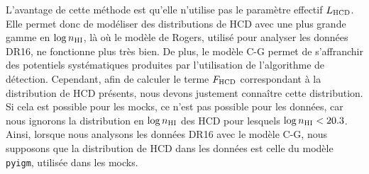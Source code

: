\documentclass[11pt, twoside, a4paper, openright]{report}
\begin{document}
L'avantage de cette méthode est qu'elle n'utilise pas le paramètre effectif $L_{\textsc{HCD}}$. Elle permet donc de modéliser des distributions de HCD avec une plus grande gamme en $\log n_{\textsc{HI}}$, là où le modèle de Rogers, utilisé pour analyser les données DR16, ne fonctionne plus très bien.
De plus, le modèle C-G permet de s'affranchir des potentiels systématiques produites par l'utilisation de l'algorithme de détection.
Cependant, afin de calculer le terme $F_{\textsc{HCD}}$ correspondant à la distribution de HCD présents, nous devons justement connaître cette distribution. Si cela est possible pour les mocks, ce n'est pas possible pour les données, car nous ignorons la distribution en $\log n_{\textsc{HI}}$ des HCD pour lesquels $\log n_{\textsc{HI}} < \num{20.3}$.
Ainsi, lorsque nous analysons les données DR16 avec le modèle C-G, nous supposons que la distribution de HCD dans les données est celle du modèle \texttt{pyigm}, utilisée dans les mocks. %
\end{document}

